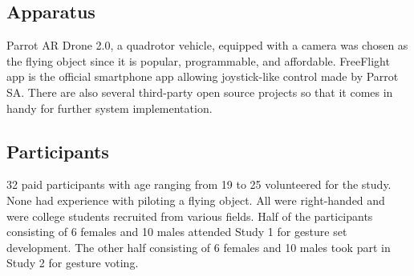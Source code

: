 \documentclass{sigchi}
\begin{document}
\subsection{Apparatus}

Parrot AR Drone 2.0, a quadrotor vehicle, equipped with a camera was chosen as the flying object since it is popular, programmable, and affordable. FreeFlight app is the official smartphone app allowing joystick-like control made by Parrot SA. There are also several third-party open source projects so that it comes in handy for further system implementation.

\subsection{Participants}

32 paid participants with age ranging from 19 to 25 volunteered for the study. None had experience with piloting a flying object. All were right-handed and were college students recruited from various fields. Half of the participants consisting of 6 females and 10 males attended Study 1 for gesture set development. The other half consisting of 6 females and 10 males took part in Study 2 for gesture voting. 


\end{document}
